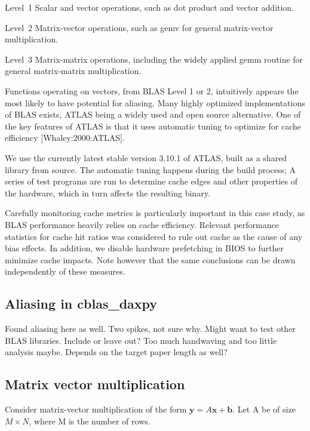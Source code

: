 \documentclass[a4paper,10pt,twocolumn,twoside]{article}
\begin{document}
\begin{description}
  \item{Level~1} Scalar and vector operations, such as dot product and vector addition.
  \item{Level~2} Matrix-vector operations, such as gemv for general matrix-vector multiplication.
  \item{Level~3} Matrix-matrix operations, including the widely applied gemm routine for general matrix-matrix multiplication. 
\end{description}

Functions operating on vectors, from BLAS Level 1 or 2, intuitively appears the most likely to have potential for aliasing.
Many highly optimized implementations of BLAS exists, ATLAS being a widely used and open source alternative. One of the key features of ATLAS is that it uses automatic tuning to optimize for cache efficiency [Whaley:2000:ATLAS]. 

We use the currently latest stable version 3.10.1 of ATLAS, built as a shared library from source.
The automatic tuning happens during the build process; A series of test programs are run to determine cache edges and other properties of the hardware, which in turn affects the resulting binary. 

Carefully monitoring cache metrics is particularly important in this case study, as BLAS performance heavily relies on cache efficiency.
Relevant performance statistics for cache hit ratios was considered to rule out cache as the cause of any bias effects.
In addition, we disable hardware prefetching in BIOS to further minimize cache impacts. 
Note however that the same conclusions can be drawn independently of these measures.

\subsection{Aliasing in cblas\_daxpy}
Found aliasing here as well. Two spikes, not sure why. Might want to test other BLAS libraries. Include or leave out? Too much handwaving and too little analysis maybe. Depends on the target paper length as well?



\subsection{Matrix vector multiplication}

Consider matrix-vector multiplication of the form $\boldsymbol{y} = A\boldsymbol{x} + \boldsymbol{b}$.
Let A be of size $M \times N$, where M is the number of rows. 
\end{document}
